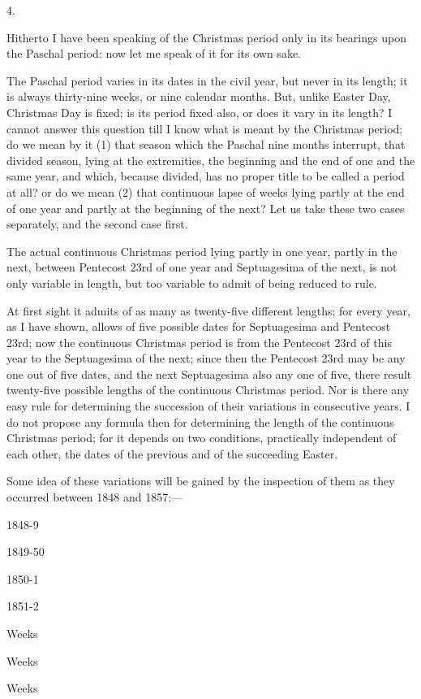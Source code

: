 4.

Hitherto I have been speaking
of the Christmas period only in its bearings upon the Paschal period:
now let me speak of it for its own sake.

The Paschal period varies in
its dates in the civil year, but never in its length; it is always
thirty-nine weeks, or nine calendar months. But, unlike Easter Day,
Christmas Day is fixed; is its period fixed also, or does it vary in
its length? I cannot answer this question till I know what is meant by
the Christmas period; do we mean by it (1) that season which the
Paschal nine months interrupt, that divided season, lying at the
extremities, the beginning and the end of one and the same year, and
which, because divided, has no proper title to be called a period at
all? or do we mean (2) that continuous lapse of weeks lying partly at
the end of one year and partly at the beginning of the next? Let us
take these two cases separately, and the second case first.

The actual continuous
Christmas period lying partly in one year, partly in the next, between
Pentecost 23rd of one year and Septuagesima of the next, is not
only variable in length, but too variable to admit of being reduced to
rule.

At first sight it admits of as
many as twenty-five different lengths; for every year, as I have
shown, allows of five possible dates for Septuagesima and Pentecost
23rd; now the continuous Christmas period is from the Pentecost 23rd
of this year to the Septuagesima of the next; since then the Pentecost
23rd may be any one out of five dates, and the next Septuagesima also
any one of five, there result twenty-five possible lengths of the
continuous Christmas period. Nor is there any easy rule for
determining the succession of their variations in consecutive years. I
do not propose any formula then for determining the length of the
continuous Christmas period; for it depends on two conditions,
practically independent of each other, the dates of the previous and
of the succeeding Easter.

Some idea of these variations
will be gained by the inspection of them as they occurred between 1848
and 1857:—

1848-9

1849-50

1850-1

1851-2

Weeks

Weeks

Weeks

